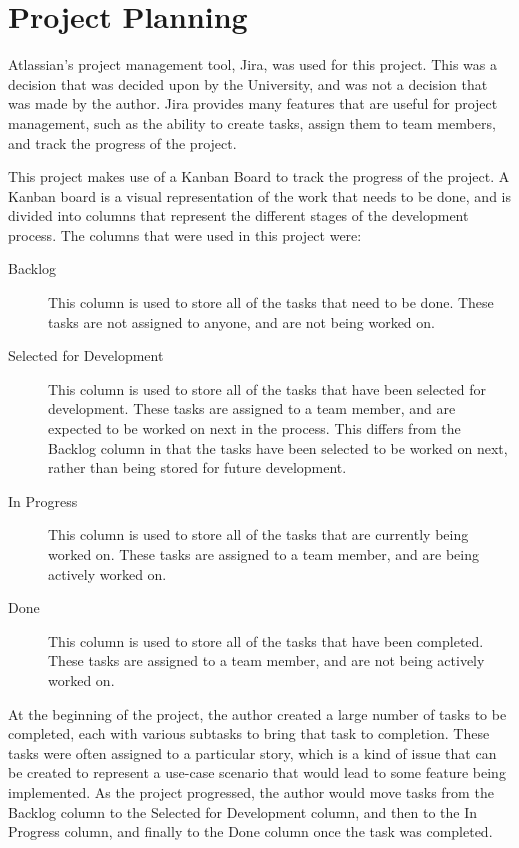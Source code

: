 \documentclass[11pt, a4paper,twoside]{report}
\theoremstyle{plain} %
\theoremstyle{definition} %
\numberwithin{equation}{chapter}
\begin{document}
\chapter{Project Planning}\label{ch:projectplanning}

Atlassian's project management tool, Jira, was used for this project.
This was a decision that was decided upon by the University, and was not
a decision that was made by the author. Jira provides many features that
are useful for project management, such as the ability to create tasks,
assign them to team members, and track the progress of the project.

This project makes use of a Kanban Board to track the progress of the project.
A Kanban board is a visual representation of the work that needs to be done,
and is divided into columns that represent the different stages of the
development process. The columns that were used in this project were:

\begin{description}
    \item[Backlog] {
        This column is used to store all of the tasks that need to be done.
        These tasks are not assigned to anyone, and are not being worked on.
        }
    \item[Selected for Development] {
        This column is used to store all of the tasks that have been selected
        for development. These tasks are assigned to a team member, and are
        expected to be worked on next in the process. This differs from the
        Backlog column in that the tasks have been selected to be worked on
        next, rather than being stored for future development.
        }
    \item[In Progress] {
        This column is used to store all of the tasks that are currently being
        worked on. These tasks are assigned to a team member, and are being
        actively worked on.
        }
    \item[Done] {
        This column is used to store all of the tasks that have been completed.
        These tasks are assigned to a team member, and are not being actively
        worked on.
        }
\end{description}

At the beginning of the project, the author created a large number of tasks
to be completed, each with various subtasks to bring that task to completion.
These tasks were often assigned to a particular story, which is a kind of issue
that can be created to represent a use-case scenario that would lead to some
feature being implemented. As the project progressed, the author would move
tasks from the Backlog column to the Selected for Development column, and then
to the In Progress column, and finally to the Done column once the task was
completed.
\end{document}
